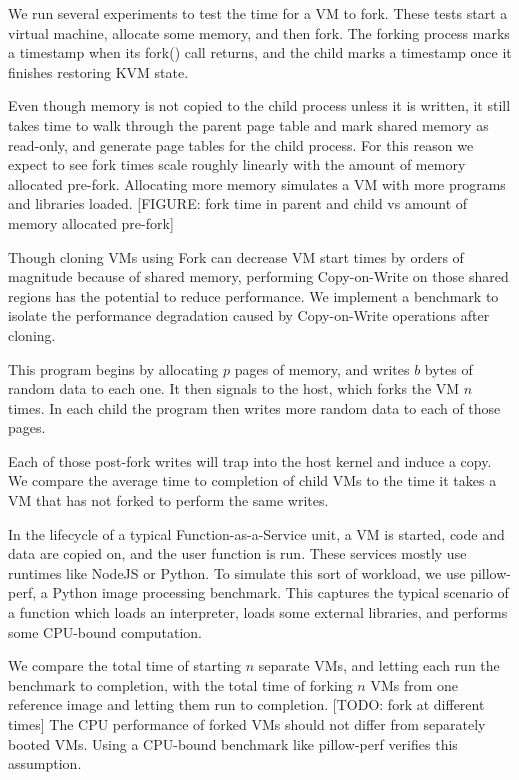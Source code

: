  We run several experiments to test the time for a VM to fork. These tests start a virtual machine, allocate some memory, and then fork. The forking process marks a timestamp when its fork() call returns, and the child marks a timestamp once it finishes restoring KVM state.

Even though memory is not copied to the child process unless it is written, it still takes time to walk through the parent page table and mark shared memory as read-only, and generate page tables for the child process. For this reason we expect to see fork times scale roughly linearly with the amount of memory allocated pre-fork. Allocating more memory simulates a VM with more programs and libraries loaded. [FIGURE: fork time in parent and child vs amount of memory allocated pre-fork]

 Though cloning VMs using Fork can decrease VM start times by orders of magnitude because of shared memory, performing Copy-on-Write on those shared regions has the potential to reduce performance. We implement a benchmark to isolate the performance degradation caused by Copy-on-Write operations after cloning.

This program begins by allocating $p$ pages of memory, and writes $b$ bytes of random data to each one. It then signals to the host, which forks the VM $n$ times. In each child the program then writes more random data to each of those pages.

Each of those post-fork writes will trap into the host kernel and induce a copy. We compare the average time to completion of child VMs to the time it takes a VM that has not forked to perform the same writes.

 In the lifecycle of a typical Function-as-a-Service unit, a VM is started, code and data are copied on, and the user function is run. These services mostly use runtimes like NodeJS or Python. To simulate this sort of workload, we use pillow-perf, a Python image processing benchmark. This captures the typical scenario of a function which loads an interpreter, loads some external libraries, and performs some CPU-bound computation.

We compare the total time of starting $n$ separate VMs, and letting each run the benchmark to completion, with the total time of forking $n$ VMs from one reference image and letting them run to completion. [TODO: fork at different times] The CPU performance of forked VMs should not differ from separately booted VMs. Using a CPU-bound benchmark like pillow-perf verifies this assumption.

